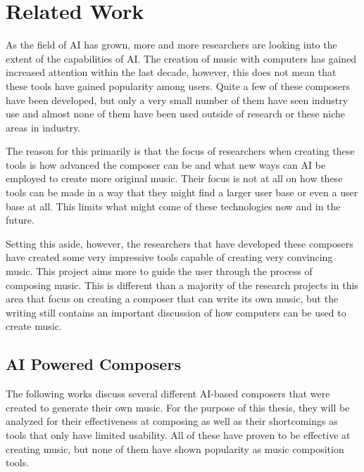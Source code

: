 \chapter{Related Work} 
\label{ch:relatedwork}

As the field of AI has grown, more and more researchers are looking into the extent of the capabilities of AI.  The creation of music with computers has gained increased attention within the last decade, however, this does not mean that these tools have gained popularity among users.  Quite a few of these composers have been developed, but only a very small number of them have seen industry use and almost none of them have been used outside of research or these niche areas in industry.

\vspace{\baselineskip}

The reason for this primarily is that the focus of researchers when creating these tools is how advanced the composer can be and what new ways can AI be employed to create more original music.  Their focus is not at all on how these tools can be made in a way that they might find a larger user base or even a user base at all.  This limits what might come of these technologies now and in the future.

\vspace{\baselineskip}

Setting this aside, however, the researchers that have developed these composers have created some very impressive tools capable of creating very convincing music.  This project aims more to guide the user through the process of composing music.  This is different than a majority of the research projects in this area that focus on creating a composer that can write its own music, but the writing still contains an important discussion of how computers can be used to create music.

\section{AI Powered Composers}
\label{sec:aipoweredcomposers}

The following works discuss several different AI-based composers that were created to generate their own music.  For the purpose of this thesis, they will be analyzed for their effectiveness at composing as well as their shortcomings as tools that only have limited usability.  All of these have proven to be effective at creating music, but none of them have shown popularity as music composition tools.

